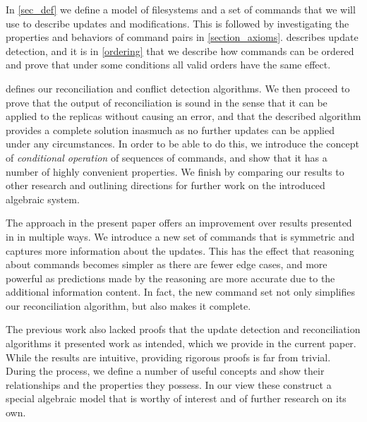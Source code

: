 In \cref{sec_def} we define a model of filesystems and a set of commands
that we will use to describe updates and modifications.
This is followed by investigating the properties and behaviors
of command pairs in \cref{section_axioms}.
 describes update detection, and it is
in \cref{ordering} that we describe how commands can be ordered
and prove that under some conditions all valid orders
have the same effect.

 defines our reconciliation 
and conflict detection algorithms.
We then proceed to prove that the output of reconciliation
is sound in the sense that 
it can be applied to the replicas without causing an error,
and that the described algorithm provides a complete solution
inasmuch as no further updates can be applied under any circumstances.
In order to be able to do this, we introduce
the concept of \emph{conditional operation} of sequences of commands,
and show that it has a number of highly convenient properties.
We finish by comparing our results to other research
and outlining directions for further work
on the introduced algebraic system.

The approach in the present paper offers an improvement
over results presented in \cite{NREC} in multiple ways.
We introduce a new set of commands that is symmetric and
captures more information about the updates.
This has the effect that reasoning about commands
becomes simpler as there are fewer edge cases,
and more powerful as 
predictions made by the reasoning are more accurate
due to the additional information content.
In fact, the new command set not only simplifies
our reconciliation algorithm, but also makes it complete.

The previous work also lacked proofs that the update detection
and reconciliation algorithms it presented work as intended,
which we provide in the current paper.
While the results are intuitive, providing rigorous proofs
is far from trivial.
During the process, we define a number of useful concepts
and show their relationships and the properties they possess.
In our view these construct a special algebraic model
that is worthy of interest and of further research on its own.

